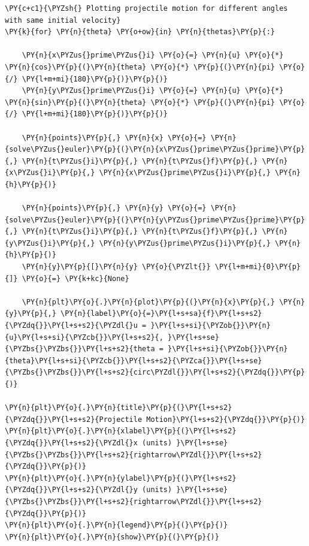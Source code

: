     \begin{tcolorbox}[breakable, size=fbox, boxrule=1pt, pad at break*=1mm,colback=cellbackground, colframe=cellborder]
\begin{Verbatim}[commandchars=\\\{\}]
\PY{c+c1}{\PYZsh{} Plotting projectile motion for different angles with same initial velocity}
\PY{k}{for} \PY{n}{theta} \PY{o+ow}{in} \PY{n}{thetas}\PY{p}{:}

    \PY{n}{x\PYZus{}prime\PYZus{}i} \PY{o}{=} \PY{n}{u} \PY{o}{*} \PY{n}{cos}\PY{p}{(}\PY{n}{theta} \PY{o}{*} \PY{p}{(}\PY{n}{pi} \PY{o}{/} \PY{l+m+mi}{180}\PY{p}{)}\PY{p}{)}
    \PY{n}{y\PYZus{}prime\PYZus{}i} \PY{o}{=} \PY{n}{u} \PY{o}{*} \PY{n}{sin}\PY{p}{(}\PY{n}{theta} \PY{o}{*} \PY{p}{(}\PY{n}{pi} \PY{o}{/} \PY{l+m+mi}{180}\PY{p}{)}\PY{p}{)}

    \PY{n}{points}\PY{p}{,} \PY{n}{x} \PY{o}{=} \PY{n}{solve\PYZus{}euler}\PY{p}{(}\PY{n}{x\PYZus{}prime\PYZus{}prime}\PY{p}{,} \PY{n}{t\PYZus{}i}\PY{p}{,} \PY{n}{t\PYZus{}f}\PY{p}{,} \PY{n}{x\PYZus{}i}\PY{p}{,} \PY{n}{x\PYZus{}prime\PYZus{}i}\PY{p}{,} \PY{n}{h}\PY{p}{)}

    \PY{n}{points}\PY{p}{,} \PY{n}{y} \PY{o}{=} \PY{n}{solve\PYZus{}euler}\PY{p}{(}\PY{n}{y\PYZus{}prime\PYZus{}prime}\PY{p}{,} \PY{n}{t\PYZus{}i}\PY{p}{,} \PY{n}{t\PYZus{}f}\PY{p}{,} \PY{n}{y\PYZus{}i}\PY{p}{,} \PY{n}{y\PYZus{}prime\PYZus{}i}\PY{p}{,} \PY{n}{h}\PY{p}{)}
    \PY{n}{y}\PY{p}{[}\PY{n}{y} \PY{o}{\PYZlt{}} \PY{l+m+mi}{0}\PY{p}{]} \PY{o}{=} \PY{k+kc}{None}

    \PY{n}{plt}\PY{o}{.}\PY{n}{plot}\PY{p}{(}\PY{n}{x}\PY{p}{,} \PY{n}{y}\PY{p}{,} \PY{n}{label}\PY{o}{=}\PY{l+s+sa}{f}\PY{l+s+s2}{\PYZdq{}}\PY{l+s+s2}{\PYZdl{}u = }\PY{l+s+si}{\PYZob{}}\PY{n}{u}\PY{l+s+si}{\PYZcb{}}\PY{l+s+s2}{, }\PY{l+s+se}{\PYZbs{}\PYZbs{}}\PY{l+s+s2}{theta = }\PY{l+s+si}{\PYZob{}}\PY{n}{theta}\PY{l+s+si}{\PYZcb{}}\PY{l+s+s2}{\PYZca{}}\PY{l+s+se}{\PYZbs{}\PYZbs{}}\PY{l+s+s2}{circ\PYZdl{}}\PY{l+s+s2}{\PYZdq{}}\PY{p}{)}

\PY{n}{plt}\PY{o}{.}\PY{n}{title}\PY{p}{(}\PY{l+s+s2}{\PYZdq{}}\PY{l+s+s2}{Projectile Motion}\PY{l+s+s2}{\PYZdq{}}\PY{p}{)}
\PY{n}{plt}\PY{o}{.}\PY{n}{xlabel}\PY{p}{(}\PY{l+s+s2}{\PYZdq{}}\PY{l+s+s2}{\PYZdl{}x (units) }\PY{l+s+se}{\PYZbs{}\PYZbs{}}\PY{l+s+s2}{rightarrow\PYZdl{}}\PY{l+s+s2}{\PYZdq{}}\PY{p}{)}
\PY{n}{plt}\PY{o}{.}\PY{n}{ylabel}\PY{p}{(}\PY{l+s+s2}{\PYZdq{}}\PY{l+s+s2}{\PYZdl{}y (units) }\PY{l+s+se}{\PYZbs{}\PYZbs{}}\PY{l+s+s2}{rightarrow\PYZdl{}}\PY{l+s+s2}{\PYZdq{}}\PY{p}{)}
\PY{n}{plt}\PY{o}{.}\PY{n}{legend}\PY{p}{(}\PY{p}{)}
\PY{n}{plt}\PY{o}{.}\PY{n}{show}\PY{p}{(}\PY{p}{)}
\end{Verbatim}
\end{tcolorbox}

